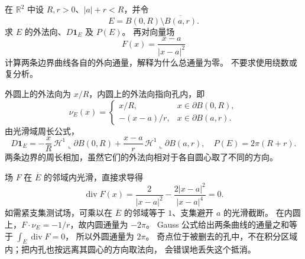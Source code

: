 \begin{exercise}\label{b1:ex:27-eccentric-hole-flux}
在 \(\mathbb R^2\) 中设 \(R,r>0\)、\(|a|+r<R\)，并令
\[
 E=B(0,R)\setminus\overline{B(a,r)}.
\]
求 \(E\) 的外法向、\(D\mathbf1_E\) 及 \(P(E)\)。
再对向量场
\[
 F(x)=\frac{x-a}{|x-a|^2}
\]
计算两条边界曲线各自的外向通量，解释为什么总通量为零。
不要求使用绕数或复分析。
\end{exercise}
\begin{solution}
外圆上的外法向为 \(x/R\)，内圆上的外法向指向孔内，即
\[
 \nu_E(x)=
 \begin{cases}
 x/R,&x\in\partial B(0,R),\\
 -(x-a)/r,&x\in\partial B(a,r).
 \end{cases}
\]
由光滑域周长公式，
\[
 D\mathbf1_E
 =-\frac{x}{R}\,\mathcal H^1\!\llcorner\partial B(0,R)
   +\frac{x-a}{r}\,\mathcal H^1\!\llcorner\partial B(a,r),
 \quad P(E)=2\pi(R+r).
\]
两条边界的周长相加，虽然它们的外法向相对于各自圆心取了不同的方向。

场 \(F\) 在 \(\overline E\) 的邻域内光滑，直接求导得
\[
 \operatorname{div}F(x)
 =\frac2{|x-a|^2}-\frac{2|x-a|^2}{|x-a|^4}=0.
\]
如需紧支集测试场，可乘以在 \(\overline E\) 的邻域等于 \(1\)、支集避开 \(a\) 的光滑截断。
在内圆上，\(F\cdot\nu_E=-1/r\)，故内圆通量为 \(-2\pi\)。
Gauss 公式给出两条曲线的通量之和等于 \(\int_E\operatorname{div}F=0\)，
所以外圆通量为 \(2\pi\)。
奇点位于被删去的孔中，不在积分区域内；把内孔也按远离其圆心的方向取法向，
会错误地丢失这个抵消。
\end{solution}

